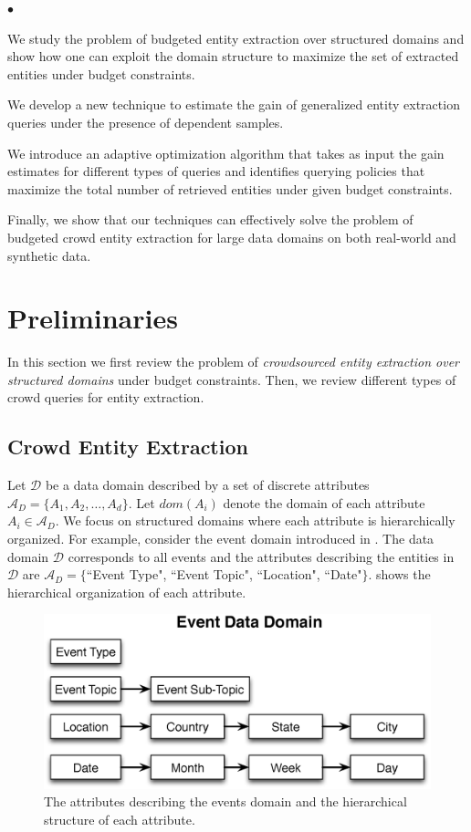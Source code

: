 \documentclass{sig-alternate}
\newcommand{\squishlist}{
   \begin{list}{$\bullet$}
    {
      \setlength{\itemsep}{0pt}
      \setlength{\parsep}{3pt}
      \setlength{\topsep}{3pt}
      \setlength{\partopsep}{0pt}
      \setlength{\leftmargin}{1.5em}
      \setlength{\labelwidth}{1em}
      \setlength{\labelsep}{0.5em} } }
\newcommand{\squishend}{
    \end{list}  }
\newcommand{\domain}{\mathcal{D}}
\newcommand{\attributes}{\mathcal{A}_D}
\begin{document}
\squishlist
\item We study the problem of budgeted entity extraction over structured domains and show how one can exploit the domain structure to maximize the set of extracted entities under budget constraints. 
\item We develop a new technique to estimate the gain of generalized entity extraction queries under the presence of dependent samples.
\item We introduce an adaptive optimization algorithm that takes as input the gain estimates for different types of queries and identifies querying policies that maximize the total number of retrieved entities under given budget constraints. 
\item Finally, we show that our techniques can effectively solve the problem of budgeted crowd entity extraction for large data domains on both real-world and synthetic data.
\squishend

\section{Preliminaries}
\label{sec:prelims}
In this section we first review the problem of {\em crowdsourced entity extraction over structured domains} under budget constraints. Then, we review different types of crowd queries for entity extraction.

\subsection{Crowd Entity Extraction}
\label{sec:extraction}
Let $\domain$ be a data domain described by a set of discrete attributes $\attributes = \{A_1, A_2, \dots, A_d\}$. Let $dom(A_i)$ denote the domain of each attribute $A_i  \in \attributes$. We focus on structured domains where each attribute is hierarchically organized. For example, consider the event domain introduced in . The data domain $\domain$ corresponds to all events and the attributes describing the entities in $\domain$ are $\attributes = \{$``Event Type", ``Event Topic", ``Location", ``Date"$\}$.  shows the hierarchical organization of each attribute.

\begin{figure}
	\begin{center}
	\includegraphics[clip,scale=0.4]{figs/eventsDomain.eps}
	\caption{The attributes describing the events domain and the hierarchical structure of each attribute.}
	\label{fig:eventsdomain}
	\end{center}
\end{figure}
\end{document}
